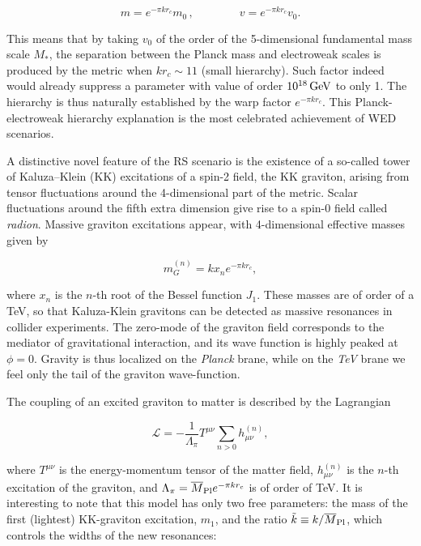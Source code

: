 \begin{equation}\label{eqn:WED_6}
m = e^{-\pi kr_c}m_0 \, , \qquad\qquad v = e^{-\pi kr_c}v_0.
\end{equation}

This means that by taking $v_0$ of the order of the 5-dimensional fundamental mass scale $M_*$, the separation between the Planck mass and electroweak scales
is produced by the metric when $kr_c \sim 11$ (small hierarchy). Such factor indeed would already suppress a parameter with value of order $10^{18}\,\text{Ge\hspace{-.08em}V}$ to only 1\TeV.
The hierarchy is thus naturally established by the warp factor $e^{-\pi kr_c}$.
This Planck-electroweak hierarchy explanation is the most celebrated achievement of WED scenarios.

A distinctive novel feature of the RS scenario is the existence of a so-called tower of Kaluza--Klein (KK) excitations of a spin-2 field, the KK graviton, arising from tensor fluctuations 
around the 4-dimensional part of the metric. Scalar fluctuations around the fifth extra dimension give rise to a spin-0 field called \textit{radion}.
Massive graviton excitations appear, with 4-dimensional effective masses given by

\begin{equation}\label{eqn:WED_7}
m_G^{(n)} = kx_ne^{-\pi kr_c},
\end{equation}

\noindent where $x_n$ is the $n$-th root of the Bessel function $J_1$. These masses are of order of a TeV, so that Kaluza-Klein gravitons can be detected as massive resonances in collider experiments. 
The zero-mode of the graviton field corresponds to the mediator of gravitational interaction, and its wave function is highly peaked at $\phi = 0$. Gravity is thus localized on the \textit{Planck} brane, while on the \textit{TeV} brane we feel only the tail of the graviton wave-function. %

The coupling of an excited graviton to matter is described by the Lagrangian

\begin{equation}\label{eqn:WED_8}
\mathcal{L} = - \frac{1}{\Lambda_\pi}T^{\mu\nu}\sum_{n>0}h^{(n)}_{\mu\nu},
\end{equation}

\noindent where $T^{\mu\nu}$ is the energy-momentum tensor of the matter field, $h^{(n)}_{\mu\nu}$ is the $n$-th excitation of the graviton,
and $\Lambda_\pi = \overline{M}_\mathrm{Pl} e^{-\pi kr_c}$ is of order of TeV.
It is interesting to note that this model has only two free parameters: the mass of the first (lightest) KK-graviton excitation, $m_1$, and the ratio $\tilde{k} \equiv  k/\overline{M}_\mathrm{Pl}$, which controls the widths of the new resonances:

